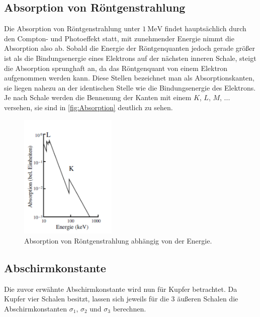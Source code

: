 \subsection{Absorption von Röntgenstrahlung}
\label{sec:Absorption von Röntgenstrahlung}

Die Absorption von Röntgenstrahlung unter $\qty{1}{\mega\electronvolt}$ findet hauptsächlich durch den Compton- und
Photoeffekt statt, mit zunehmender Energie nimmt die Absorption also ab. Sobald die Energie der Röntgenquanten jedoch
gerade größer ist als die Bindungsenergie eines Elektrons auf der nächsten inneren Schale, steigt die Absorption sprunghaft an,
da das Röntgenquant von einem Elektron aufgenommen werden kann.
Diese Stellen bezeichnet man als Absorptionskanten, sie liegen nahezu an der identischen Stelle wie die Bindungsenergie
des Elektrons. Je nach Schale werden die Bennenung der Kanten mit einem $K$, $L$, $M$, ... versehen, sie sind in
\autoref{fig:Absorption} deutlich zu sehen.

\begin{figure}[H]
    \centering
    \includegraphics[height=6cm]{content/pics/absorption.pdf}
    \caption{Absorption von Röntgenstrahlung abhängig von der Energie.\cite{v602}}
    \label{fig:Absorption}
\end{figure}

\subsection{Abschirmkonstante}
\label{sec:Abschirmkonstante}

Die zuvor erwähnte Abschirmkonstante wird nun für Kupfer betrachtet.
Da Kupfer vier Schalen besitzt, lassen sich jeweils für die 3 äußeren Schalen die Abschirmkonstanten
$\sigma_1$, $\sigma_2$ und $\sigma_3$ berechnen.

